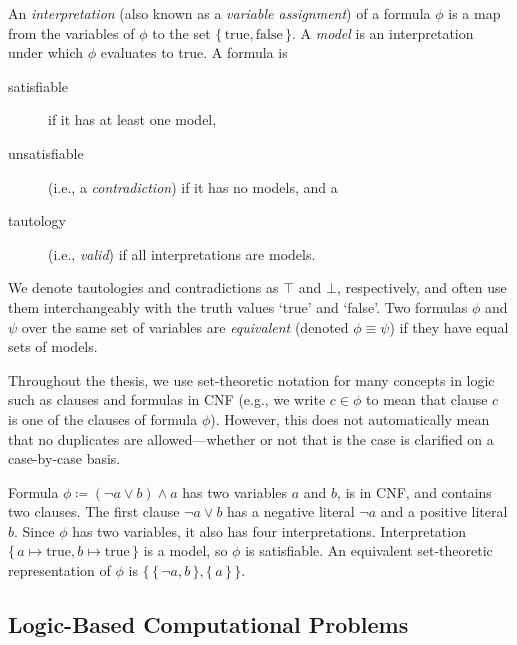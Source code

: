 An \emph{interpretation} (also known as a \emph{variable assignment}) of a formula $\phi$ is a map from the variables of $\phi$ to the set $\{\, \text{true}, \text{false} \,\}$. A \emph{model} is an interpretation under which $\phi$ evaluates to true. A formula is
\begin{description}
\item[satisfiable] if it has at least one model,
\item[unsatisfiable] (i.e., a \emph{contradiction}) if it has no models, and a
\item[tautology] (i.e., \emph{valid}) if all interpretations are models.
\end{description}
We denote tautologies and contradictions as $\top$ and $\bot$, respectively, and often use them interchangeably with the truth values `true' and `false'. Two formulas $\phi$ and $\psi$ over the same set of variables are \emph{equivalent} (denoted $\phi \equiv \psi$) if they have equal sets of models.

Throughout the thesis, we use set-theoretic notation for many concepts in logic such as clauses and formulas in CNF (e.g., we write $c \in \phi$ to mean that clause $c$ is one of the clauses of formula $\phi$). However, this does not automatically mean that no duplicates are allowed---whether or not that is the case is clarified on a case-by-case basis.

\begin{example} \label{example:logic}
  Formula $\phi \coloneqq (\neg a \lor b) \land a$ has two variables $a$ and $b$, is in CNF, and contains two clauses. The first clause $\neg a \lor b$ has a negative literal $\neg a$ and a positive literal $b$. Since $\phi$ has two variables, it also has four interpretations. Interpretation $\{\, a \mapsto \text{true}, b \mapsto \text{true} \,\}$ is a model, so $\phi$ is satisfiable. An equivalent set-theoretic representation of $\phi$ is $\{\, \{\, \neg a, b \,\}, \{\, a \,\} \,\}$.
\end{example}


\subsection{Logic-Based Computational Problems} \label{sec:logicproblems}


